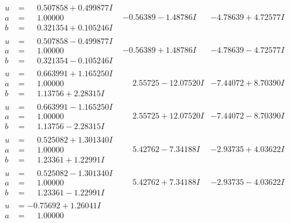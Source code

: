 \documentclass[1p]{elsarticle_modified}
\theoremstyle{definition}
\begin{document}
$$\begin{array}{c|c|c}
\begin{aligned}
u &= \phantom{-}0.507858 + 0.499877 I \\
a &= \phantom{-}1.00000\phantom{ +0.000000I} \\
b &= \phantom{-}0.321354 + 0.105246 I\end{aligned}
 & -0.56389 - 1.48786 I & -4.78639 + 4.72577 I \\ \hline\begin{aligned}
u &= \phantom{-}0.507858 - 0.499877 I \\
a &= \phantom{-}1.00000\phantom{ +0.000000I} \\
b &= \phantom{-}0.321354 - 0.105246 I\end{aligned}
 & -0.56389 + 1.48786 I & -4.78639 - 4.72577 I \\ \hline\begin{aligned}
u &= \phantom{-}0.663991 + 1.165250 I \\
a &= \phantom{-}1.00000\phantom{ +0.000000I} \\
b &= \phantom{-}1.13756 + 2.28315 I\end{aligned}
 & \phantom{-}2.55725 - 12.07520 I & -7.44072 + 8.70390 I \\ \hline\begin{aligned}
u &= \phantom{-}0.663991 - 1.165250 I \\
a &= \phantom{-}1.00000\phantom{ +0.000000I} \\
b &= \phantom{-}1.13756 - 2.28315 I\end{aligned}
 & \phantom{-}2.55725 + 12.07520 I & -7.44072 - 8.70390 I \\ \hline\begin{aligned}
u &= \phantom{-}0.525082 + 1.301340 I \\
a &= \phantom{-}1.00000\phantom{ +0.000000I} \\
b &= \phantom{-}1.23361 + 1.22991 I\end{aligned}
 & \phantom{-}5.42762 - 7.34188 I & -2.93735 + 4.03622 I \\ \hline\begin{aligned}
u &= \phantom{-}0.525082 - 1.301340 I \\
a &= \phantom{-}1.00000\phantom{ +0.000000I} \\
b &= \phantom{-}1.23361 - 1.22991 I\end{aligned}
 & \phantom{-}5.42762 + 7.34188 I & -2.93735 - 4.03622 I \\ \hline\begin{aligned}
u &= -0.75692 + 1.26041 I \\
a &= \phantom{-}1.00000\phantom{ +0.000000I} \\

\end{aligned}
\end{array}$$
\end{document}
